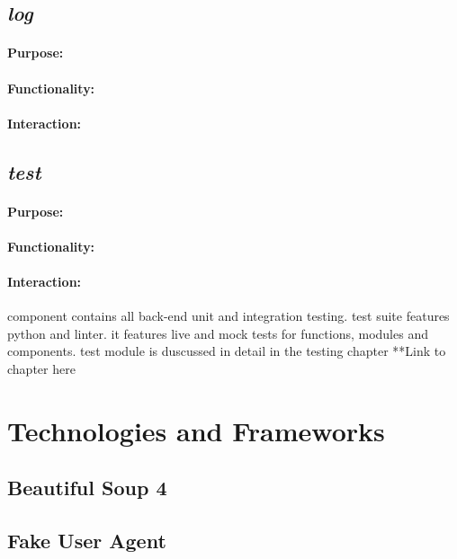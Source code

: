 \documentclass{thesis-ekf}
\theoremstyle{definition}
\theoremstyle{remark}
\begin{document}
{\subsection{\emph{log}}
\paragraph{Purpose:}


\paragraph{Functionality:}


\paragraph{Interaction:}

\subsection{\emph{test}}
\paragraph{Purpose:}


\paragraph{Functionality:}


\paragraph{Interaction:}

component contains all back-end unit and integration testing. test suite features python and linter. it features live and mock tests for functions, modules and components. test module is duscussed in detail in the testing chapter **Link to chapter here


\section{Technologies and Frameworks}

\subsection{Beautiful Soup 4}
\subsection{Fake User Agent}
}
\end{document}
